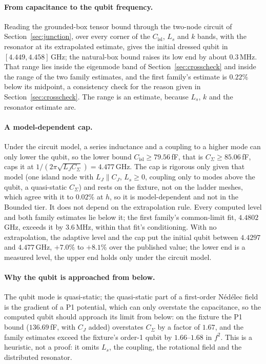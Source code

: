 \documentclass{anvil-paper}
\newcommand{\Cisl}{C_{\mathrm{isl}}}
\begin{document}
\paragraph{From capacitance to the qubit frequency.}
Reading the grounded-box tensor bound through the two-node circuit of
Section~\ref{sec:junction}, over every corner of the $\Cisl$, $L_s$ and
$k$ bands, with the resonator at its extrapolated estimate, gives the
initial dressed qubit in $[4.449, 4.458]$\,GHz; the natural-box bound raises
its low end by about $0.3$\,MHz. That range lies inside the eigenmode band of
Section~\ref{sec:crosscheck} and inside the range of the two family
estimates, and the first family's estimate is $0.22\%$ below its
midpoint, a consistency check for the reason given in
Section~\ref{sec:crosscheck}. The range is an estimate, because $L_s$, $k$
and the resonator estimate are.

\paragraph{A model-dependent cap.}
Under the circuit model, a series inductance and a coupling to a higher
mode can only lower the qubit, so the lower bound $\Cisl \ge 79.56$\,fF,
that is $C_\Sigma \ge 85.06$\,fF, caps it at $1/(2\pi\sqrt{L_J C_\Sigma})
= 4.477$\,GHz. The cap is rigorous only given that model (one island node
with $L_J \parallel C_J$, $L_s \ge 0$, coupling only to modes above the
qubit, a quasi-static $C_\Sigma$) and rests on the fixture, not on the
ladder meshes, which agree with it to $0.02\%$ at $h$, so it is
model-dependent and not in the Bounded tier. It does not depend on the
extrapolation rule. Every computed level and both family estimates lie
below it; the first family's common-limit fit, $4.4802$\,GHz, exceeds it by
$3.6$\,MHz, within that fit's conditioning. With no extrapolation, the
adaptive level and the cap put the initial qubit between $4.4297$ and
$4.477$\,GHz, $+7.0\%$ to $+8.1\%$ over the published value; the lower end
is a measured level, the upper end holds only under the circuit model.

\paragraph{Why the qubit is approached from below.}
The qubit mode is quasi-static; the quasi-static part of a first-order
N\'ed\'elec field is the gradient of a P1 potential, which can only
overstate the capacitance, so the computed qubit should approach its limit
from below: on the fixture the P1 bound ($136.69$\,fF, with $C_J$ added)
overstates $C_\Sigma$ by a factor of $1.67$, and the family estimates exceed
the fixture's order-1 qubit by $1.66$--$1.68$ in $f^2$. This is a heuristic, not a proof: it omits $L_s$,
the coupling, the rotational field and the distributed resonator.
\end{document}
